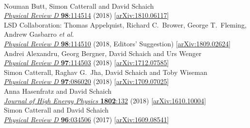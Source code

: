 \begin{spacelist}
\begin{revnumerate}
    \pagebreakitem
       \\
      Nouman Butt, Simon Catterall and David Schaich \\
      \href{http://dx.doi.org/10.1103/PhysRevD.98.114514}{\textit{Physical Review D} \textbf{98}:114514} (2018) [\href{http://arxiv.org/abs/1810.06117}{arXiv:1810.06117}]
    \pagebreakitem
       \\
      LSD Collaboration: Thomas Appelquist, Richard C.~Brower, George T.~Fleming, Andrew Gasbarro \textit{et al.} \\ %
      \href{http://dx.doi.org/10.1103/PhysRevD.98.114510}{\textit{Physical Review D} \textbf{98}:114510} (2018, Editors' Suggestion) [\href{http://arxiv.org/abs/1809.02624}{arXiv:1809.02624}]
    \pagebreakitem
       \\
      Andrei Alexandru, Georg Bergner, David Schaich and Urs Wenger \\
      \href{http://dx.doi.org/10.1103/PhysRevD.97.114503}{\textit{Physical Review D} \textbf{97}:114503} (2018) [\href{http://arxiv.org/abs/1712.07585}{arXiv:1712.07585}]
    \pagebreakitem
       \\
      Simon Catterall, Raghav G.~Jha, David Schaich and Toby Wiseman \\
      \href{http://dx.doi.org/10.1103/PhysRevD.97.086020}{\textit{Physical Review D} \textbf{97}:086020} (2018) [\href{http://arxiv.org/abs/1709.07025}{arXiv:1709.07025}]
    \pagebreakitem
       \\
      Anna Hasenfratz and David Schaich \\
      \href{http://dx.doi.org/10.1007/JHEP02(2018)132}{\textit{Journal of High Energy Physics} \textbf{1802}:132} (2018) [\href{http://arxiv.org/abs/1610.10004}{arXiv:1610.10004}]
    \pagebreakitem
       \\
      Simon Catterall and David Schaich \\
      \href{http://dx.doi.org/10.1103/PhysRevD.96.034506}{\textit{Physical Review D} \textbf{96}:034506} (2017) [\href{http://arxiv.org/abs/1609.08541}{arXiv:1609.08541}]

\end{revnumerate}
\end{spacelist}
